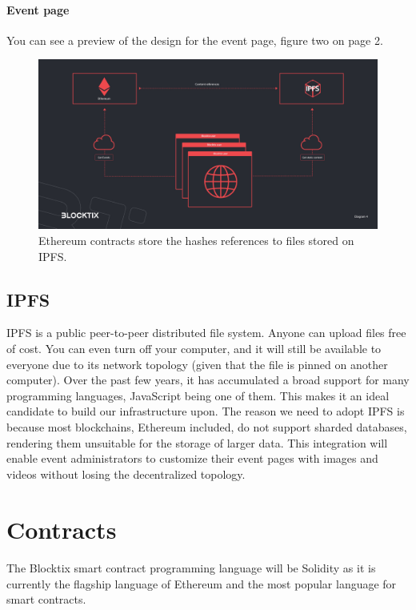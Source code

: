 \documentclass[a4paper]{article}
\begin{document}
\paragraph{Event page} You can see a preview of the design for the event page, figure two on page 2.


\begin{figure}
\centering
\includegraphics[scale=0.22]{BTX-Diagram-4.jpg}
\caption{\label{fig:BTX-Diagram-4}Ethereum contracts store the hashes references to files stored on IPFS.}
\end{figure}

\subsection{IPFS}
IPFS is a public peer-to-peer distributed file system. Anyone can upload files free of cost. You can even turn off your computer, and it will still be available to everyone due to its network topology (given that the file is pinned on another computer). Over the past few years, it has accumulated a broad support for many programming languages, JavaScript being one of them. This makes it an ideal candidate to build our infrastructure upon.
The reason we need to adopt IPFS is because most blockchains, Ethereum included, do not support sharded databases, rendering them unsuitable for the storage of larger data. This integration will enable event administrators to customize their event pages with images and videos without losing the decentralized topology.




\section{Contracts}

\paragraph{}
The Blocktix smart contract programming language will be Solidity\cite{crgwSolidity} as it is currently the flagship language of Ethereum and the most popular language for smart contracts.
\end{document}
